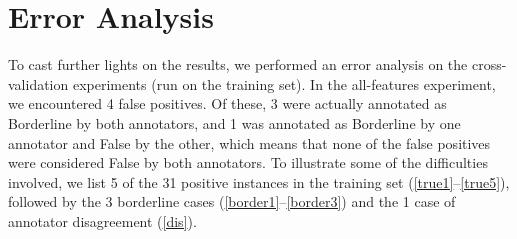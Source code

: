 \documentclass[11pt]{article}
\begin{document}
\section{Error Analysis}
To cast further lights on the results, we performed an error analysis on the cross-validation experiments (run on the training set). In the all-features experiment, we encountered 4 false positives. Of these, 3 were actually annotated as Borderline by both annotators, and 1 was annotated as Borderline by one annotator and False by the other, which means that none of the false positives were considered False by both annotators. To illustrate some of the difficulties involved, we list 5 of the 31 positive instances in the training set (\ref{true1}--\ref{true5}), followed by the 3 borderline cases (\ref{border1}--\ref{border3}) and the 1 case of annotator disagreement (\ref{dis}).
\end{document}
